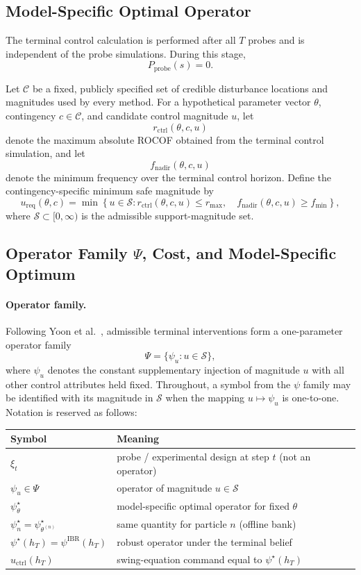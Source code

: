 \documentclass[11pt]{article}
\begin{document}
\subsection{Model-Specific Optimal Operator}

The terminal control calculation is performed after all \(T\) probes and is independent of the probe simulations. During this stage,
\[
P_{\mathrm{probe}}(s)=0.
\]

Let \(\mathcal C\) be a fixed, publicly specified set of credible disturbance
locations and magnitudes used by every method. For a hypothetical parameter
vector \(\theta\), contingency \(c\in\mathcal C\), and candidate control
magnitude \(u\), let
\[
r_{\mathrm{ctrl}}(\theta,c,u)
\]
denote the maximum absolute ROCOF obtained from the terminal control simulation, and let
\[
f_{\mathrm{nadir}}(\theta,c,u)
\]
denote the minimum frequency over the terminal control horizon. Define the
contingency-specific minimum safe magnitude by
\[
\boxed{
u_{\mathrm{req}}(\theta,c)
=
\min
\left\{
u\in\mathcal S:
r_{\mathrm{ctrl}}(\theta,c,u)\le r_{\max},
\quad
f_{\mathrm{nadir}}(\theta,c,u)\ge f_{\min}
\right\},
}
\label{eq:u_req}
\]
where \(\mathcal S\subset[0,\infty)\) is the admissible support-magnitude set.

\subsection{Operator Family \(\Psi\), Cost, and Model-Specific Optimum}

\paragraph{Operator family.}
Following Yoon et al.~\cite{yoon2013}, admissible terminal interventions form a
one-parameter operator family
\[
\boxed{
\Psi
=
\bigl\{\psi_u:u\in\mathcal S\bigr\},
}
\label{eq:psi_family}
\]
where \(\psi_u\) denotes the constant supplementary injection of magnitude
\(u\) with all other control attributes held fixed. Throughout, a symbol from
the \(\psi\) family may be identified with its magnitude in \(\mathcal S\) when
the mapping \(u\mapsto\psi_u\) is one-to-one. Notation is reserved as follows:
\begin{center}
\begin{tabular}{@{}ll@{}}
\toprule
Symbol & Meaning \\
\midrule
\(\xi_t\) & probe / experimental design at step \(t\) (not an operator) \\
\(\psi_u\in\Psi\) & operator of magnitude \(u\in\mathcal S\) \\
\(\psi_\theta^\star\) & model-specific optimal operator for fixed \(\theta\) \\
\(\psi_n^\star=\psi_{\theta^{(n)}}^\star\) & same quantity for particle \(n\) (offline bank) \\
\(\psi^\star(h_T)=\psi^{\mathrm{IBR}}(h_T)\) & robust operator under the terminal belief \\
\(u_{\mathrm{ctrl}}(h_T)\) & swing-equation command equal to \(\psi^\star(h_T)\) \\
\bottomrule
\end{tabular}
\end{center}
\end{document}
